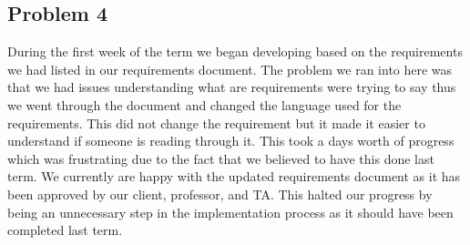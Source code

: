 \documentclass[draftclsnofoot,10pt,onecolumn]{IEEEtran} %
\begin{document}
\subsection{Problem 4}
During the first week of the term we began developing based on the requirements
we had listed in our requirements document. The problem we ran into here was
that we had issues understanding what are requirements were trying to say thus
we went through the document and changed the language used for the requirements.
This did not change the requirement but it made it easier to understand if
someone is reading through it. This took a days worth of progress which was
frustrating due to the fact that we believed to have this done last term. We
currently are happy with the updated requirements document as it has been
approved by our client, professor, and TA. This halted our progress by being an
unnecessary step in the implementation process as it should have been completed
last term.
\end{document}
